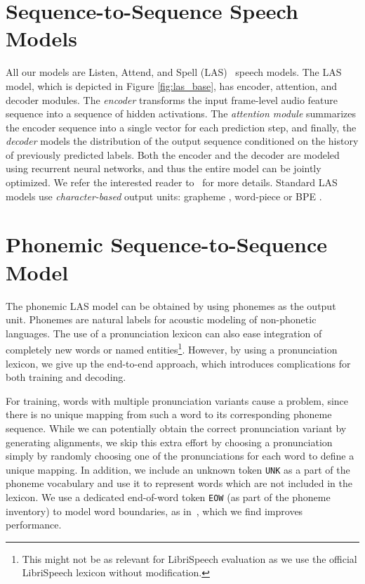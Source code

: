 \section{Sequence-to-Sequence Speech Models}
\label{sec:model}
All our models are Listen, Attend, and Spell (LAS)~\cite{lasicassp2016} speech models.
The LAS model, which is depicted in Figure \ref{fig:las_base}, has encoder, attention, and decoder modules. %
The \textit{encoder} transforms the input frame-level audio feature sequence into
a sequence of hidden activations. The \textit{attention module} summarizes the
encoder sequence into a single vector for each prediction step, and finally,
the \textit{decoder} models the distribution of the output sequence conditioned
on the history of previously predicted labels.
Both the encoder and the decoder are modeled using recurrent neural networks,
and thus the entire model can be jointly optimized.
We refer the interested reader to~\cite{lasicassp2016, RPis2017, WeissCJWC17} for more details.
Standard LAS models use \textit{character-based} output units:
grapheme \cite{lasicassp2016}, word-piece \cite{ChiuSWPNCKWRGJL18} or BPE \cite{zeyer2018:asr-attention}.
\vspace{-2mm}
\section{Phonemic Sequence-to-Sequence Model}
\vspace{-1mm}
The phonemic LAS model can be obtained by using phonemes as the output unit.
Phonemes are natural labels for acoustic modeling of non-phonetic languages.
The use of a pronunciation lexicon can also ease integration of
completely new words or named entities\footnote{This might not be as relevant
for LibriSpeech evaluation as we use the official LibriSpeech lexicon without
modification.}\cite{bruguier19}.
However, by using a pronunciation lexicon, we give
up the end-to-end approach, which introduces complications for both training and
decoding.

For training, words with multiple pronunciation variants cause a problem, since
there is no unique mapping from such a word to its corresponding phoneme
sequence.
While we can potentially obtain the correct pronunciation variant by generating
alignments, we skip this extra effort by choosing a pronunciation simply by
randomly choosing one of the pronunciations for each word to define a unique
mapping.
In addition, we include an unknown token \texttt{UNK} as a part of the phoneme vocabulary and
use it to represent words which are not included in the lexicon.
We use a dedicated end-of-word token \texttt{EOW} (as part of the phoneme
inventory) to model word boundaries, as in~\cite{sainath2017no}, which we
find improves performance.

